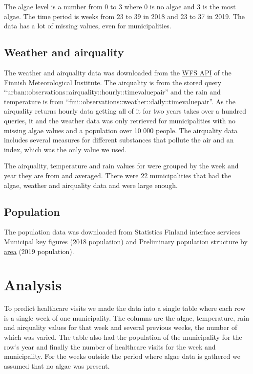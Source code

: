 \documentclass[a4paper, 12pt, english]{article}
\begin{document}
The algae level is a number from 0 to 3 where 0 is no algae
and 3 is the most algae. The time period is weeks from 23 to 39
in 2018 and 23 to 37 in 2019.
The data has a lot of missing values, even for municipalities.

\subsection{Weather and airquality}
The weather and airquality data was downloaded from the
\href{https://en.ilmatieteenlaitos.fi/open-data-manual-fmi-wfs-services}{WFS API}
of the Finnish Meteorological Institute.
The airquality is from the stored query
\mbox{``urban::observations::airquality::hourly::timevaluepair''}
and the rain and temperature is from
\mbox{``fmi::observations::weather::daily::timevaluepair''}.
As the airquality returns hourly data getting all of it
for two years takes over a hundred queries,
it and the weather data was only retrieved for
municipalities with no missing algae values and
a population over 10 000 people. The airquality data includes
several measures for different substances that
pollute the air and an index, which was the only value
we used.

The airquality, temperature and rain values for were
grouped by the week and year they are from and
averaged. There were 22 municipalities that had the
algae, weather and airquality data and were large
enough.

\subsection{Population}
The population data was downloaded from Statistics Finland interface services
\href{https://pxnet2.stat.fi/PXWeb/pxweb/en/Kuntien_avainluvut/Kuntien_avainluvut__2019/kuntien_avainluvut_2019_aikasarja.px/table/tableViewLayout1/?rxid=444223df-f91c-4479-891f-5dcd50b983d2}
{Municipal key figures} (2018 population) and
\href{http://pxnet2.stat.fi/PXWeb/pxweb/fi/StatFin/StatFin__vrm__vamuu/statfin_vamuu_pxt_11lj.px/table/tableViewLayout1/}{Preliminary population structure by area} (2019 population).

\section{Analysis}
To predict healthcare visits we made the data into a
single table where each row is a single week of one
municipality. The columns are the algae, temperature,
rain and airquality values for that week and several
previous weeks, the number of which was varied.
The table also had the population of the municipality
for the row's year and finally the number of healthcare
visits for the week and municipality.
For the weeks outside the period where algae data
is gathered we assumed that no algae was present.
\end{document}
